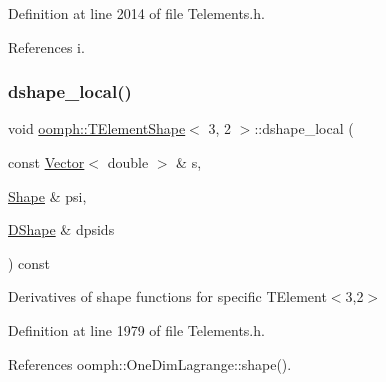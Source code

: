 Definition at line 2014 of file Telements.\+h.



References i.

\mbox{\label{classoomph_1_1TElementShape_3_013_00_012_01_4_ae1f8f28b63ff3a35f8bb8d460b651938}} 
\subsubsection{\texorpdfstring{dshape\+\_\+local()}{dshape\_local()}}
{\footnotesize\ttfamily void \hyperlink{classoomph_1_1TElementShape}{oomph\+::\+T\+Element\+Shape}$<$ 3, 2 $>$\+::dshape\+\_\+local (\begin{DoxyParamCaption}\item[{const \hyperlink{classoomph_1_1Vector}{Vector}$<$ double $>$ \&}]{s,  }\item[{\hyperlink{classoomph_1_1Shape}{Shape} \&}]{psi,  }\item[{\hyperlink{classoomph_1_1DShape}{D\+Shape} \&}]{dpsids }\end{DoxyParamCaption}) const\hspace{0.3cm}{\ttfamily [inline]}}



Derivatives of shape functions for specific T\+Element$<$3,2$>$ 



Definition at line 1979 of file Telements.\+h.



References oomph\+::\+One\+Dim\+Lagrange\+::shape().

\mbox{\label{classoomph_1_1TElementShape_3_013_00_012_01_4_a505b9c977fc4d5dcb2366440fb619482}} 
